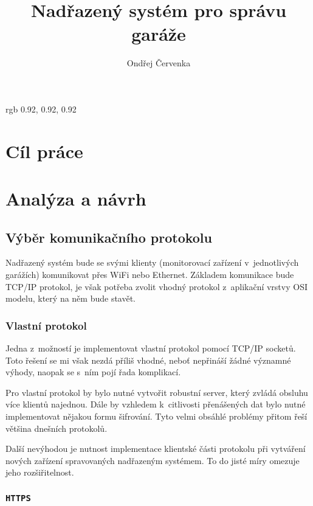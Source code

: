 \documentclass[thesis=M,czech]{FITthesis}[2012/06/26]
\title{Nadřazený systém pro správu garáže}
\author{Ondřej Červenka} %
\begin{document}
\definecolor {codebg} {rgb} {0.92, 0.92, 0.92}


\begin{introduction}
\end{introduction}

\chapter{Cíl práce}

\chapter{Analýza a návrh}

\section{Výběr komunikačního protokolu}

Nadřazený systém bude se svými klienty (monitorovací zařízení v~jednotlivých garážích) komunikovat přes WiFi nebo Ethernet. Základem komunikace bude TCP/IP protokol, je však potřeba zvolit vhodný protokol z~aplikační vrstvy OSI modelu, který na něm bude stavět.

\subsection{Vlastní protokol}

Jedna z~možností je implementovat vlastní protokol pomocí TCP/IP socketů. Toto řešení se mi však nezdá příliš vhodné, neboť nepřináší žádné významné výhody, naopak se s~ním pojí řada komplikací.

Pro vlastní protokol by bylo nutné vytvořit robustní server, který zvládá obsluhu více klientů najednou. Dále by vzhledem k~citlivosti přenášených dat bylo nutné implementovat nějakou formu šifrování. Tyto velmi obsáhlé problémy přitom řeší většina dnešních protokolů.

Další nevýhodou je nutnost implementace klientské části protokolu při vytváření nových zařízení spravovaných nadřazeným systémem. To do jisté míry omezuje jeho rozšiřitelnost.

\subsection{\texttt{HTTPS}}
\end{document}

